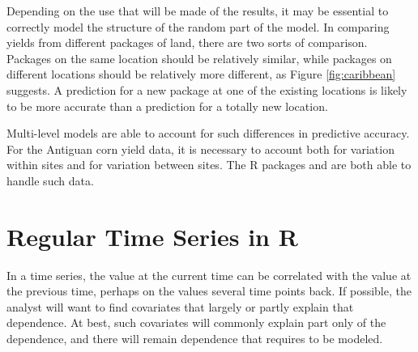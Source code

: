 Depending on the use that will be made of the results, it may be
essential to correctly model the structure of the random part of the
model.  In comparing yields from different packages of land, there are
two sorts of comparison.  Packages on the same location should be
relatively similar, while packages on different locations should be
relatively more different, as Figure \ref{fig:caribbean} suggests.
A prediction for a new package at one of the existing locations is
likely to be more accurate than a prediction for a totally new
location.

  Multi-level
models are able to account for such differences in predictive
accuracy.  For the Antiguan corn yield data, it is necessary to
account both for variation within sites and for variation between
sites.  The R packages  and  are both able to
handle such data.


\section{Regular Time Series in R}\label{sec:ts}
\noindent
{}
\vspace*{15pt}


In a time series, the value at the current time can be correlated with
the value at the previous time, perhaps on the values several time
points back.  If possible, the analyst will want to find covariates
that largely or partly explain that dependence.  At best, such
covariates will commonly explain part only of the dependence,
and there will remain dependence that requires to be modeled.

